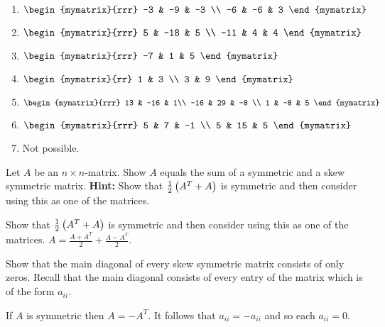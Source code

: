 \begin{enumialphparenastyle}
\begin{ex}
\begin{sol}
\begin{enumerate}
\item $\begin{mymatrix}{rrr}
-3 & -9 & -3 \\
-6 & -6 & 3
\end{mymatrix}$
\item $\begin{mymatrix}{rrr}
5 & -18 & 5 \\
-11 & 4 & 4
\end{mymatrix}$
\item $\begin{mymatrix}{rrr}
-7 & 1 & 5
\end{mymatrix}$
\item $\begin{mymatrix}{rr}
1 & 3 \\
3 & 9
\end{mymatrix}$
\item $\begin{mymatrix}{rrr}
13 & -16 & 1\\
-16 & 29 & -8 \\
1 & -8 & 5
\end{mymatrix}$
\item $\begin{mymatrix}{rrr}
5 & 7 & -1 \\
5 & 15 & 5 
\end{mymatrix}$
\item Not possible.
\end{enumerate}
\end{sol}
\end{ex}

\begin{ex} Let $A$ be an $n\times n$-matrix. Show $A$ equals the sum of a
symmetric and a skew symmetric matrix.  
\textbf{Hint: }Show that $
\frac{1}{2}\left(A^{T}+A\right) $ is symmetric and then consider using this
as one of the matrices. 
\begin{sol}
Show that $\frac{1}{2}\left(A^{T}+A\right) $ is symmetric and then consider using this
as one of the matrices. $A=\frac{A+A^{T}}{2}+\frac{A-A^{T}}{2}$.
\end{sol}
\end{ex}

\begin{ex} Show that the main diagonal of every skew symmetric matrix consists of only zeros. Recall that the main diagonal consists of every entry of the matrix which is of the form
$a_{ii}$. 
\begin{sol}
If $A$ is symmetric then $A=-A^{T}$. It follows that $a_{ii}=-a_{ii}$ and so each $a_{ii}=0$.
\end{sol}
\end{ex}


\end{enumialphparenastyle}
